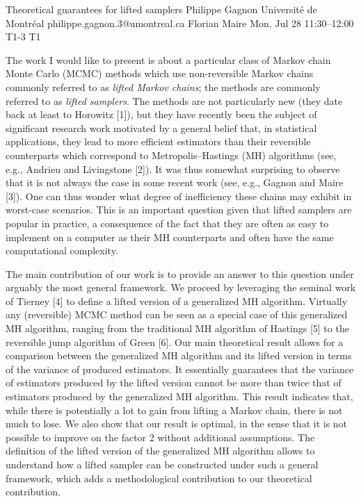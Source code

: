 \begin{talk}
  {Theoretical guarantees for lifted samplers}%
  {Philippe Gagnon}%
  {Université de Montréal}%
  {philippe.gagnon.3@umontreal.ca}%
  {Florian Maire}%
  {}%
  {Mon, Jul 28 11:30–12:00}%
  {T1-3}%
  {T1}%
  {}%
				
			
The work I would like to present is about a particular class of Markov chain Monte Carlo (MCMC) methods which use non-reversible Markov chains commonly referred to as \textit{lifted Markov chains}; the methods are commonly referred to as \textit{lifted samplers}. The methods are not particularly new (they date back at least to Horowitz [1]), but they have recently been the subject of significant research work motivated by a general belief that, in statistical applications, they lead to more efficient estimators than their reversible counterparts which correspond to Metropolis--Hastings (MH) algorithms (see, e.g., Andrieu and Livingstone [2]). It was thus somewhat surprising to observe that it is not always the case in some recent work (see, e.g., Gagnon and Maire [3]). One can thus wonder what degree of inefficiency these chains may exhibit in worst-case scenarios. This is an important question given that lifted samplers are popular in practice, a consequence of the fact that they are often as easy to implement on a computer as their MH counterparts and often have the same computational complexity.

The main contribution of our work is to provide an answer to this question under arguably the most general framework. We proceed by leveraging the seminal work of Tierney [4] to define a lifted version of a generalized MH algorithm. Virtually any (reversible) MCMC method can be seen as a special case of this generalized MH algorithm, ranging from the traditional MH algorithm of Hastings [5] to the reversible jump algorithm of Green [6]. Our main theoretical result allows for a comparison between the generalized MH algorithm and its lifted version in terms of the variance of produced estimators. It essentially guarantees that the variance of estimators produced by the lifted version cannot be more than twice that of estimators produced by the generalized MH algorithm. This result indicates that, while there is potentially a lot to gain from lifting a Markov chain, there is not much to lose. We also show that our result is optimal, in the sense that it is not possible to improve on the factor 2 without additional assumptions. The definition of the lifted version of the generalized MH algorithm allows to understand how a lifted sampler can be constructed under such a general framework, which adds a methodological contribution to our theoretical contribution.


\end{talk}
